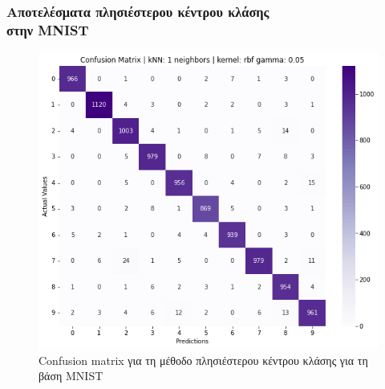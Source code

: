 \documentclass{beamer}
\begin{document}
\begin{frame}
\frametitle{Αποτελέσματα πλησιέστερου κέντρου κλάσης\\στην MNIST}

\begin{figure}[H]
    \centering
    \includegraphics[width=0.6\linewidth]{mnist/confusion_matrix_knn.png}
    \caption{Confusion matrix για τη μέθοδο πλησιέστερου κέντρου κλάσης για τη
    βάση MNIST}
    \label{fig:mnist_confusion_nc}
\end{figure}

\end{frame}
\end{document}

